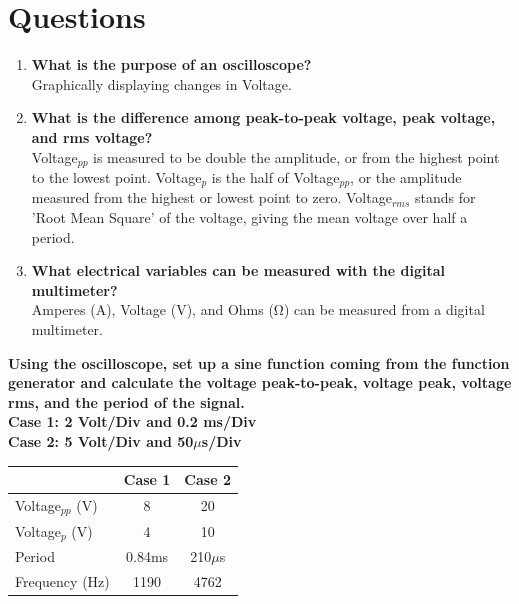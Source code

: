\documentclass{article}
\begin{document}
	\section*{Questions}
	\begin{enumerate}
	\item \textbf{What is the purpose of an oscilloscope?}\\
		Graphically displaying changes in Voltage.
		 \item \textbf{What is the difference among peak-to-peak voltage, peak voltage, and rms voltage?}\\
			 Voltage$_{pp}$ is measured to be double the amplitude, or from the highest point to the lowest point. Voltage$_{p}$ is the half of Voltage$_{pp}$, or the amplitude measured from the highest or lowest point to zero. Voltage$_{rms}$ stands for 'Root Mean Square' of the voltage, giving the mean voltage over half a period. 
	\item \textbf{What electrical variables can be measured with the digital multimeter?}\\
	Amperes (A), Voltage (V), and Ohms (\si{\ohm}) can be measured from a digital multimeter.
	\end{enumerate}
	\textbf{Using the oscilloscope, set up a sine function coming from the function generator and calculate the voltage peak-to-peak, voltage peak, voltage rms, and the period of the signal.\\
	Case 1: 2 Volt/Div and 0.2 ms/Div\\
Case 2: 5 Volt/Div and 50$\mu$s/Div\\}
	\begin{table}[h]
		\begin{center}
		\begin{tabular}{l|c|c}
			& \textbf{Case 1} & \textbf{Case 2}\\
			\hline
			Voltage$_{pp}$ (V)& 8&20\\
			Voltage$_{p}$ (V)&4&10\\
			Period&0.84ms&210$\mu$s\\
			Frequency (Hz)&1190&4762\\
		\end{tabular}
		\end{center}
	\end{table}
\end{document}
